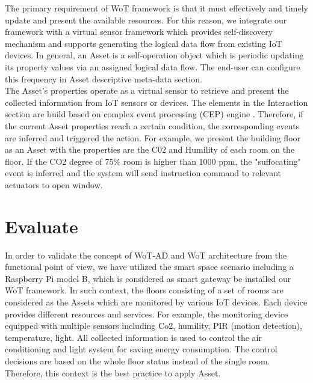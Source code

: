 The primary requirement of WoT framework is that it must effectively and timely update and present the available resources. For this reason, we integrate our framework with a virtual sensor framework \cite{kim2017scalable} which provides self-discovery mechanism and supports generating the logical data flow from existing IoT devices. In general, an Asset is a self-operation object which is periodic updating its property values via an assigned logical data flow. The end-user can configure this frequency in Asset descriptive meta-data section.\\

The Asset's properties operate as a virtual sensor to retrieve and present the collected information from IoT sensors or devices. The elements in the Interaction section are build based on complex event processing (CEP) engine \cite{chen2014complex}. Therefore, if the current Asset properties reach a certain condition, the corresponding events are inferred and triggered the action. For example, we present the building floor as an Asset with the properties are the C02 and Humility of each room on the floor. If the CO2 degree of 75\% room is higher than 1000 ppm, the "suffocating" event is inferred and the system will send instruction command to relevant actuators to open window.


\section{Evaluate}
In order to validate the concept of WoT-AD and WoT architecture from the functional point of view, we have utilized the smart space scenario including a Raspberry Pi model B, which is considered as smart gateway be installed our WoT framework. In such context, the floors consisting of a set of rooms are considered as the Assets which are monitored by various IoT devices. Each device provides different resources and services. For example, the monitoring device equipped with multiple sensors including Co2, humility, PIR (motion detection), temperature, light. All collected information is used to control the air conditioning and light system for saving energy consumption. The control decisions are based on the whole floor status instead of the single room. Therefore, this context is the best practice to apply Asset. \\

